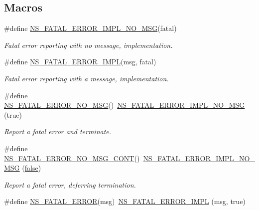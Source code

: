 \subsection*{Macros}
\begin{DoxyCompactItemize}
\item 
\#define \hyperlink{group__fatal_ga0c4238330e9f9d2a304131a45251980b}{N\+S\+\_\+\+F\+A\+T\+A\+L\+\_\+\+E\+R\+R\+O\+R\+\_\+\+I\+M\+P\+L\+\_\+\+N\+O\+\_\+\+M\+SG}(fatal)
\begin{DoxyCompactList}\small\item\em Fatal error reporting with no message, implementation. \end{DoxyCompactList}\item 
\#define \hyperlink{group__fatal_gadb2a57b89e19d41a406ce49bb3d77664}{N\+S\+\_\+\+F\+A\+T\+A\+L\+\_\+\+E\+R\+R\+O\+R\+\_\+\+I\+M\+PL}(msg,  fatal)
\begin{DoxyCompactList}\small\item\em Fatal error reporting with a message, implementation. \end{DoxyCompactList}\item 
\#define \hyperlink{group__fatal_gabe68f8439b933855d5f829072c58e1e5}{N\+S\+\_\+\+F\+A\+T\+A\+L\+\_\+\+E\+R\+R\+O\+R\+\_\+\+N\+O\+\_\+\+M\+SG}()~\hyperlink{group__fatal_ga0c4238330e9f9d2a304131a45251980b}{N\+S\+\_\+\+F\+A\+T\+A\+L\+\_\+\+E\+R\+R\+O\+R\+\_\+\+I\+M\+P\+L\+\_\+\+N\+O\+\_\+\+M\+SG} (true)
\begin{DoxyCompactList}\small\item\em Report a fatal error and terminate. \end{DoxyCompactList}\item 
\#define \hyperlink{group__fatal_ga375f5661b840c7b761ca8e8f96687d98}{N\+S\+\_\+\+F\+A\+T\+A\+L\+\_\+\+E\+R\+R\+O\+R\+\_\+\+N\+O\+\_\+\+M\+S\+G\+\_\+\+C\+O\+NT}()~\hyperlink{group__fatal_ga0c4238330e9f9d2a304131a45251980b}{N\+S\+\_\+\+F\+A\+T\+A\+L\+\_\+\+E\+R\+R\+O\+R\+\_\+\+I\+M\+P\+L\+\_\+\+N\+O\+\_\+\+M\+SG} (\hyperlink{lte__cqi__generation_8m_ab1bef239d413c4da139c4bac92cd657a}{false})
\begin{DoxyCompactList}\small\item\em Report a fatal error, deferring termination. \end{DoxyCompactList}\item 
\#define \hyperlink{group__fatal_ga5131d5e3f75d7d4cbfd706ac456fdc85}{N\+S\+\_\+\+F\+A\+T\+A\+L\+\_\+\+E\+R\+R\+OR}(msg)~\hyperlink{group__fatal_gadb2a57b89e19d41a406ce49bb3d77664}{N\+S\+\_\+\+F\+A\+T\+A\+L\+\_\+\+E\+R\+R\+O\+R\+\_\+\+I\+M\+PL} (msg, true)

\end{DoxyCompactItemize}
